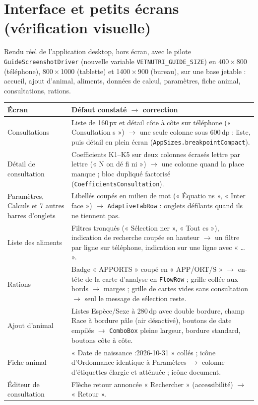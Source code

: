 \documentclass[11pt,a4paper]{article}
\newcommand{\code}[1]{\texttt{#1}}
\begin{document}
\section{Interface et petits écrans (vérification visuelle)}
Rendu réel de l'application desktop, hors écran, avec le pilote
\code{GuideScreenshotDriver} (nouvelle variable \code{VETNUTRI\_GUIDE\_SIZE}) en
400\,×\,800 (téléphone), 800\,×\,1000 (tablette) et 1400\,×\,900 (bureau), sur une base
jetable : accueil, ajout d'animal, aliments, données de calcul, paramètres, fiche animal,
consultations, rations.

\begin{longtable}{p{3.2cm}p{11.5cm}}
\toprule
Écran & Défaut constaté $\to$ correction \\
\midrule
Consultations & Liste de 160\,px et détail côte à côte sur téléphone (« Consultation s ») $\to$
  une seule colonne sous 600\,dp : liste, puis détail en plein écran
  (\code{AppSizes.breakpointCompact}). \\
Détail de consultation & Coefficients K1--K5 sur deux colonnes écrasés lettre par lettre
  (« N on dé fi ni ») $\to$ une colonne quand la place manque ; bloc dupliqué factorisé
  (\code{CoefficientsConsultation}). \\
Paramètres, Calculs et 7 autres barres d'onglets & Libellés coupés en milieu de mot
  (« Équatio ns », « Inter face ») $\to$ \code{AdaptiveTabRow} : onglets défilants quand ils
  ne tiennent pas. \\
Liste des aliments & Filtres tronqués (« Sélection ner », « Tout es »), indication de recherche
  coupée en hauteur $\to$ un filtre par ligne sur téléphone, indication sur une ligne avec
  « … ». \\
Rations & Badge « APPORTS » coupé en « APP/ORT/S » $\to$ en-tête de la carte d'analyse en
  \code{FlowRow} ; grille collée aux bords $\to$ marges ; grille de cartes vides sans
  consultation $\to$ seul le message de sélection reste. \\
Ajout d'animal & Listes Espèce/Sexe à 280\,dp avec double bordure, champ Race à bordure
  pâle (air désactivé), boutons de date empilés $\to$ \code{ComboBox} pleine largeur,
  bordure standard, boutons côte à côte. \\
Fiche animal & « Date de naissance :2026-10-31 » collés ; icône d'Ordonnance identique à
  Paramètres $\to$ colonne d'étiquettes élargie et atténuée ; icône document. \\
Éditeur de consultation & Flèche retour annoncée « Rechercher » (accessibilité) $\to$
  « Retour ». \\
\bottomrule
\end{longtable}
\end{document}
